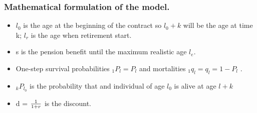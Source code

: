 \documentclass{beamer}
\begin{document}
\begin{frame}
\frametitle{Mathematical formulation of the model.}

\begin{itemize}
  \item $ l_0$ is the age at the beginning of the contract so $l_0+k$ will be the age at time k; $l_r$ is the age when retirement start.
  \item s is the pension benefit until the maximum realistic age $l_e$.
  \item One-step survival probabilities $_{1}P_l = P_l$ and mortalities $_{1}q_l = q_l = 1- P_l$ . 
  \
  \item  $_{k} P_{l_0}$ is the probability that and individual of age $l_0$ is alive at age $l+k$
  \item d = $1\over{1+r}$ is the discount.
  
\end{itemize}
\end{frame}
\end{document}
